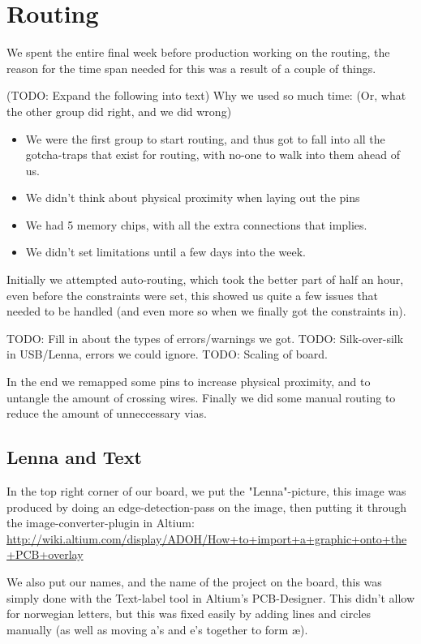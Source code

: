 \section {Routing}

We spent the entire final week before production working on the routing,
the reason for the time span needed for this was a result of a couple of
things.

(TODO: Expand the following into text)
Why we used so much time: (Or, what the other group did right, and we did wrong)
\begin {itemize}
\item We were the first group to start routing, and thus got to fall into all the gotcha-traps that
exist for routing, with no-one to walk into them ahead of us.
\item We didn't think about physical proximity when laying out the pins
\item We had 5 memory chips, with all the extra connections that implies.
\item We didn't set limitations until a few days into the week.
\end {itemize}

Initially we attempted auto-routing, which took the better part of half an hour,
even before the constraints were set, this showed us quite a few issues that needed
to be handled (and even more so when we finally got the constraints in).

TODO: Fill in about the types of errors/warnings we got.
TODO: Silk-over-silk in USB/Lenna, errors we could ignore.
TODO: Scaling of board.

In the end we remapped some pins to increase physical proximity, and to untangle the
amount of crossing wires. Finally we did some manual routing to reduce the amount of
unneccessary vias.

\subsection {Lenna and Text}
In the top right corner of our board, we put the "Lenna"-picture, this image
was produced by doing an edge-detection-pass on the image, then putting it through
the image-converter-plugin in Altium: \url{http://wiki.altium.com/display/ADOH/How+to+import+a+graphic+onto+the+PCB+overlay}

We also put our names, and the name of the project on the board, this was simply done
with the Text-label tool in Altium's PCB-Designer. This didn't allow for norwegian letters,
but this was fixed easily by adding lines and circles manually (as well as moving a's and e's together
to form æ).
